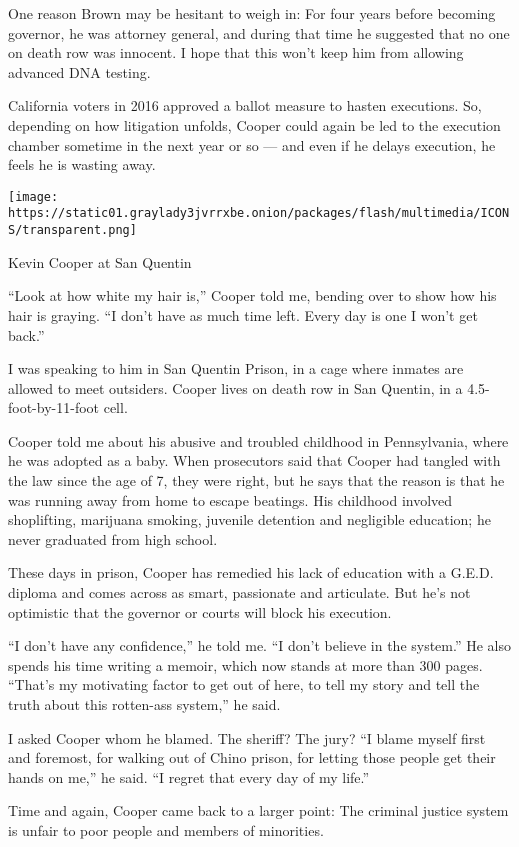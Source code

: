 One reason Brown may be hesitant to weigh in: For four years before
becoming governor, he was attorney general, and during that time he
suggested that no one on death row was innocent. I hope that this won't
keep him from allowing advanced DNA testing.

California voters in 2016 approved a ballot measure to hasten
executions. So, depending on how litigation unfolds, Cooper could again
be led to the execution chamber sometime in the next year or so --- and
even if he delays execution, he feels he is wasting away.

\texttt{[image: https://static01.graylady3jvrrxbe.onion/packages/flash/multimedia/ICONS/transparent.png]}

Kevin Cooper at San Quentin

``Look at how white my hair is,'' Cooper told me, bending over to show
how his hair is graying. ``I don't have as much time left. Every day is
one I won't get back.''

I was speaking to him in San Quentin Prison, in a cage where inmates are
allowed to meet outsiders. Cooper lives on death row in San Quentin, in
a 4.5-foot-by-11-foot cell.

Cooper told me about his abusive and troubled childhood in Pennsylvania,
where he was adopted as a baby. When prosecutors said that Cooper had
tangled with the law since the age of 7, they were right, but he says
that the reason is that he was running away from home to escape
beatings. His childhood involved shoplifting, marijuana smoking,
juvenile detention and negligible education; he never graduated from
high school.

These days in prison, Cooper has remedied his lack of education with a
G.E.D. diploma and comes across as smart, passionate and articulate. But
he's not optimistic that the governor or courts will block his
execution.

``I don't have any confidence,'' he told me. ``I don't believe in the
system.'' He also spends his time writing a memoir, which now stands at
more than 300 pages. ``That's my motivating factor to get out of here,
to tell my story and tell the truth about this rotten-ass system,'' he
said.

I asked Cooper whom he blamed. The sheriff? The jury? ``I blame myself
first and foremost, for walking out of Chino prison, for letting those
people get their hands on me,'' he said. ``I regret that every day of my
life.''

Time and again, Cooper came back to a larger point: The criminal justice
system is unfair to poor people and members of minorities.

